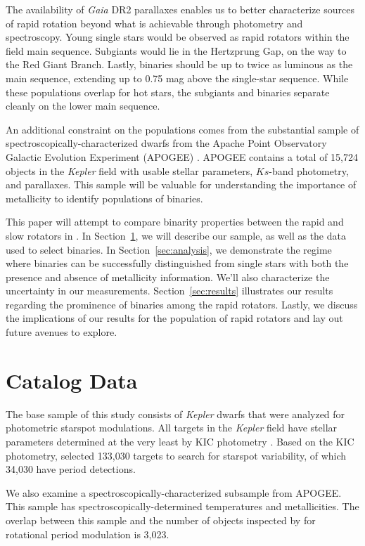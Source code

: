 \documentclass[twocolumn]{aastex6}
\newcommand{\Kepler}{\mbox{\textit{Kepler}}}
\newcommand{\Gaia}{\mbox{\textit{Gaia}}}
\begin{document}
The availability of \Gaia{} DR2 parallaxes \citep{Gaia18,Lindegren18} 
enables us to better characterize sources of rapid rotation beyond what is
achievable through photometry and spectroscopy. Young single stars would be
observed as rapid rotators within the field main sequence. Subgiants would lie 
in the Hertzprung Gap, on the way to the Red Giant Branch. Lastly, binaries 
should be up to twice as luminous as the main sequence, extending up to 0.75 
mag above the single-star sequence.  While these populations overlap for hot 
stars, the subgiants and binaries separate cleanly on the lower main sequence.

An additional constraint on the populations comes from the substantial sample
of spectroscopically-characterized dwarfs from the Apache Point Observatory
Galactic Evolution Experiment (APOGEE) \citep{Majewski17}. APOGEE contains a 
total of 15,724 objects in the \Kepler{} field with usable stellar parameters,
\(Ks\)-band photometry, and parallaxes.  This sample will be valuable for 
understanding the importance of metallicity to identify populations of 
binaries.

This paper will attempt to compare binarity properties between the rapid and 
slow rotators in \citet{McQuillan14}. In Section~\ref{sec:data}, we will describe our 
sample, as well as the data used to select binaries. In Section~\ref{sec:analysis}, we demonstrate the regime where 
binaries can be successfully distinguished from single stars with both the 
presence and absence of metallicity information. We'll also characterize the 
uncertainty in our measurements. Section~\ref{sec:results} illustrates our 
results regarding the prominence of binaries among the rapid rotators. Lastly, 
we discuss the implications of our results for the population of rapid rotators 
and lay out future avenues to explore.

\section{Catalog Data}
\label{sec:data}

The base sample of this study consists of \Kepler{} dwarfs that were analyzed
for photometric starspot modulations. All targets in the \Kepler{} field have 
stellar parameters determined at the very least by KIC photometry 
\citep{Brown11}. Based on the KIC photometry, \citet{McQuillan14} selected 
133,030 targets to search for starspot variability, of which 34,030 have 
period detections.

We also examine a spectroscopically-characterized subsample from APOGEE\@. 
This sample has spectroscopically-determined temperatures and metallicities. 
The overlap between this sample and the number of objects inspected by 
\citet{McQuillan14} for rotational period modulation is 3,023.
\end{document}
